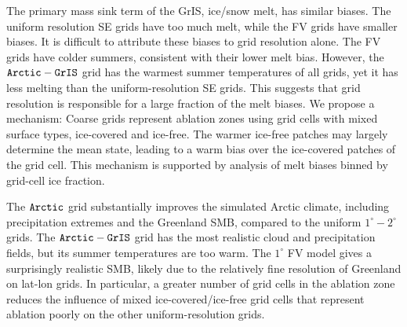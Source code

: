 \documentclass[draft]{agujournal2019}
\begin{document}
The primary mass sink term of the GrIS, ice/snow melt, has similar biases. The uniform resolution SE grids have too much melt, while the FV grids have smaller biases. It is difficult to attribute these biases to grid resolution alone.  The FV grids have colder summers, consistent with their lower melt bias. However, the $\tt Arctic-GrIS$ grid has the warmest summer temperatures of all grids, yet it has less melting than the uniform-resolution SE grids. This suggests that grid resolution is responsible for a large fraction of the melt biases. We propose a mechanism: Coarse grids represent ablation zones using grid cells with mixed surface types, ice-covered and ice-free.  The warmer ice-free patches may largely determine the mean state, leading to a warm bias over the ice-covered patches of the grid cell. This mechanism is supported by analysis of melt biases binned by grid-cell ice fraction. 

The $\tt Arctic$ grid substantially improves the simulated Arctic climate, including precipitation extremes and the Greenland SMB, compared to the uniform $1^{\circ}-2^{\circ}$ grids. The $\tt Arctic-GrIS$ grid has the most realistic cloud and precipitation fields, but its summer temperatures are too warm. The $1^{\circ}$ FV model gives a surprisingly realistic SMB, likely due to the relatively fine resolution of Greenland on lat-lon grids. {\color{purple}{It is also the most heavily tuned model configuration. May be worth mentioning here as well.}} In particular, a greater number of grid cells in the ablation zone reduces the influence of mixed ice-covered/ice-free grid cells that represent ablation poorly on the other uniform-resolution grids.
\end{document}
